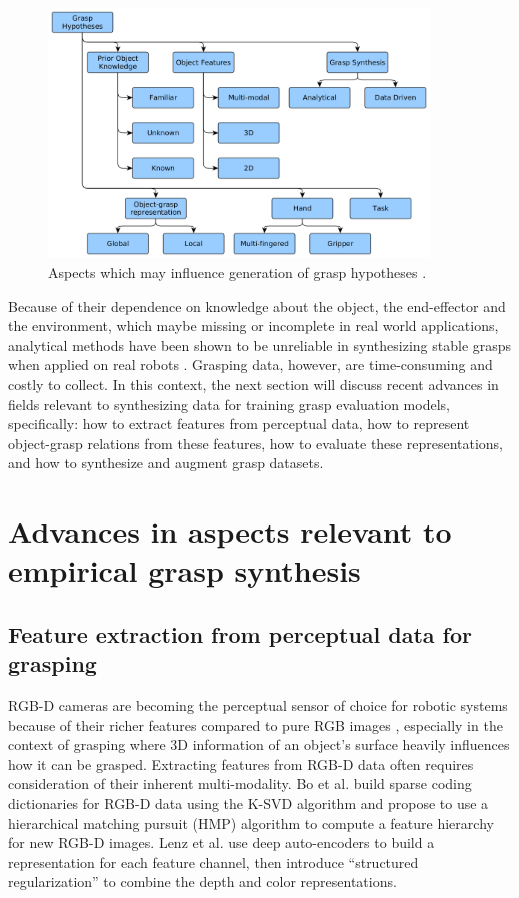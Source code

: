 \documentclass[runningheads]{../llncs}
\begin{document}
\begin{figure}[h!]
    \centering
    \includegraphics[width=0.9\textwidth]{bohg14-grasp_synthesis_mind_map}
    \caption{Aspects which may influence generation of grasp hypotheses \cite{Bohg2014}.}
    \label{fig:grasp_synthesis_mind_map}
\end{figure}

Because of their dependence on knowledge about the object, the end-effector and the environment, which maybe missing
or incomplete in real world applications, analytical methods have been shown to be unreliable in synthesizing stable
grasps when applied on real robots \cite{Kappler2015,Rubert2017,WeiszAllen2012}. Grasping data, however, are
time-consuming and costly to collect. In this context, the next section will discuss recent advances in fields relevant
to synthesizing data for training grasp evaluation models, specifically: how to extract features from perceptual data,
how to represent object-grasp relations from these features, how to evaluate these representations, and how to
synthesize and augment grasp datasets.

\section{Advances in aspects relevant to empirical grasp synthesis}

\subsection{Feature extraction from perceptual data for grasping}

RGB-D cameras are becoming the perceptual sensor of choice for robotic systems because of their richer features
compared to pure RGB images \cite{lenz2015,Eitel2015,Gupta2014RGBDFeatures,jiang2011}, especially in the context of
grasping where 3D information of an object's surface heavily influences how it can be grasped. Extracting features from
RGB-D data often requires consideration of their inherent multi-modality. Bo et al. \cite{Bo2013} build sparse coding
dictionaries for RGB-D data using the K-SVD algorithm and propose to use a hierarchical matching pursuit (HMP)
algorithm to compute a feature hierarchy for new RGB-D images. Lenz et al. \cite{lenz2015} use deep auto-encoders to
build a representation for each feature channel, then introduce ``structured regularization'' to combine the depth and
color representations.
\end{document}
